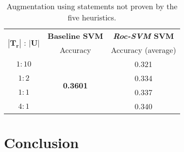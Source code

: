 \documentclass[12pt,twoside,notitlepage,amsart]{report} %
\begin{document}
	\begin{table} [h]
	\begin{center}
	\caption{{Augmentation using statements not proven by the five heuristics.}}
	
	\begin{adjustbox}{center}
	\renewcommand{\arraystretch}{1.2}
	\begin{tabular}{||c||c||c||}
	
	\hline
	
	\multirow{2}{*}{$|\mathbf{T_r}|$ : $|\mathbf{U}|$ } & \multicolumn{1}{|c||}{\textbf{Baseline SVM}} & \multicolumn{1}{|c||}{\textbf{\emph{Roc-SVM} SVM} }  \\\cline{2-3}
	
	& Accuracy & Accuracy (average) \\
	\hline \hline
	
	$1:10$  &  \multirow{4}{*}{\textbf{0.3601}} &  0.321   \\ \cline{1-1} \cline{3-3} %
	
	$1:2$  &  & 0.334   \\ \cline{3-3}  \cline{1-1}
	
	$1:1$  & & 0.337     \\ \cline{3-3} \cline{1-1}
	
	$4:1$  &  & 0.340     \\ \hline 

	                                                             
	\hline  
	
	\end{tabular}
	\end{adjustbox}
	\end{center}
	\end{table}		
	
	

	
	\cleardoublepage
	
	
\chapter{Conclusion} %
	
\end{document}
